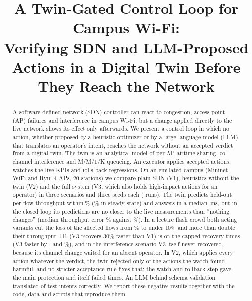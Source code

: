 \documentclass[conference]{IEEEtran}
\begin{document}
\title{A Twin-Gated Control Loop for Campus Wi-Fi:\\ Verifying SDN and LLM-Proposed Actions in a Digital Twin Before They Reach the Network}

\author{
\and
{}
}

\maketitle

\begin{abstract}
A software-defined network (SDN) controller can react to congestion, access-point (AP) failures and interference in campus Wi-Fi, but a change applied directly to the live network shows its effect only afterwards. We present a control loop in which no action, whether proposed by a heuristic optimizer or by a large language model (LLM) that translates an operator's intent, reaches the network without an accepted verdict from a digital twin. The twin is an analytical model of per-AP airtime sharing, co-channel interference and M/M/1/K queueing. An executor applies accepted actions, watches the live KPIs and rolls back regressions. On an emulated campus (Mininet-WiFi and Ryu; 4 APs, 20 stations) we compare plain SDN (V1), heuristics without the twin (V2) and the full system (V3, which also holds high-impact actions for an operator) in three scenarios and three seeds each (\NumRuns{} runs). The twin predicts held-out per-flow throughput within \TwinMape\% (\TwinSteadyVideo\% in steady state) and answers in a median \SimMedianMs\,ms, but in the closed loop its predictions are no closer to the live measurements than ``nothing changes'' (median throughput error \LiveThrErr\% against \LiveThrBase\%). In a lecture flash crowd both acting variants cut the loss of the affected flows from \KpiFlashLossVone\% to under 10\% and more than double their throughput. H1 (V3 recovers 30\% faster than V1) is \HoneCapped{} on the capped recovery times (V3 faster by \HoneFasterFlash, \HoneFasterApFail{} and \HoneFasterCochan\%), and in the interference scenario V3 itself never recovered, because its channel change waited for an absent operator. In V2, which applies every action whatever the verdict, the twin rejected only \HarmRejected{} of the \HarmAll{} actions the watch found harmful, and no stricter acceptance rule fixes that; the watch-and-rollback step gave the main protection and itself failed \RbFailAll{} times. An LLM behind schema validation translated \IntCloudOk{} of \IntCases{} test intents correctly. We report these negative results together with the code, data and scripts that reproduce them.
\end{abstract}
\end{document}
